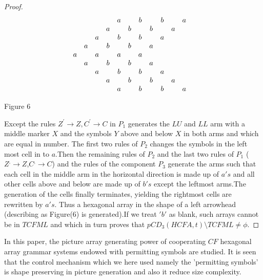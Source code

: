 \documentclass[11pt]{article}
\begin{document}
\begin{proof}
\[
\begin{array}{*{20}c}
   {} & {} & {} & {} & a & {} & b & {} & b & {} & a & {}  \\
   {} & {} & {} & a & {} & b & {} & b & {} & a & {} & {}  \\
   {} & {} & a & {} & b & {} & b & {} & a & {} & {} & {}  \\
   {} & a & {} & b & {} & b & {} & a & {} & {} & {} & {}  \\
   a & {} & a & {} & a & {} & a & {} & {} & {} & {} & {}  \\
   {} & a & {} & b & {} & b & {} & a & {} & {} & {} & {}  \\
   {} & {} & a & {} & b & {} & b & {} & a & {} & {} & {}  \\
   {} & {} & {} & a & {} & b & {} & b & {} & a & {} & {}  \\
   {} & {} & {} & {} & a & {} & b & {} & b & {} & a & {}  \\
\end{array}
\]
\centerline{Figure 6} Except the rules $Z^{'}\rightarrow Z ,
C^{'}\rightarrow C$ in $P_{1}$ generates the $LU$ and $LL$ arm
 with a middle marker $X$ and the symbols $Y$ above and below $X$ in both arms and which are equal in number.
 The first two rules of $P_{2}$ changes the symbols in the left most cell in to $a$.Then the remaining rules of $P_{2}$
 and the last two rules of $P_{1}$ ($Z^{,}\rightarrow Z$,$C^{,}\rightarrow C$) and the rules of the component $P_{3}$
 generate the arms such that each cell in the middle arm in the horizontal direction is made up of $a's$ and all other
 cells above and below are made up of $b's$ except the leftmost arms.The generation of the cells finally terminates,
 yielding the rightmost cells are rewritten by $a's$. Thus a hexagonal array in the shape of a left arrowhead
 (describing as Figure(6) is generated).If we treat $'b'$ as blank, such arrays cannot be in $TCFML$ and
 which in turn proves that $pCD_{3}(HCFA,t)\setminus TCFML \neq \phi$.
 \end{proof}

 In this paper, the picture array
generating power of cooperating $CF$ hexagonal array grammar
systems endowed with permitting symbols are studied. It is seen
that the control mechanism which we here used namely the
'permitting symbols' is shape preserving in picture generation and
also it reduce size complexity.
\end{document}
